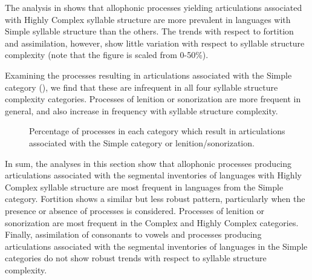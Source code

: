   The analysis in  shows that allophonic processes yielding articulations associated with Highly Complex syllable structure are more prevalent in languages with Simple syllable structure than the others. The trends with respect to fortition and assimilation, however, show little variation with respect to syllable structure complexity (note that the figure is scaled from 0-50\%).

  Examining the processes resulting in articulations associated with the Simple category (), we find that these are infrequent in all four syllable structure complexity categories. Processes of lenition or sonorization are more frequent in general, and also increase in frequency with syllable structure complexity.

\begin{figure}
\caption{\label{fig:7.5}Percentage of processes in each category which result in articulations associated with the Simple category or lenition/sonorization.}
\end{figure}

  In sum, the analyses in this section show that allophonic processes producing articulations associated with the segmental inventories of languages with Highly Complex syllable structure are most frequent in languages from the Simple category. Fortition shows a similar but less robust pattern, particularly when the presence or absence of processes is considered. Processes of lenition or sonorization are most frequent in the Complex and Highly Complex categories. Finally, assimilation of consonants to vowels and processes producing articulations associated with the segmental inventories of languages in the Simple categories do not show robust trends with respect to syllable structure complexity.

